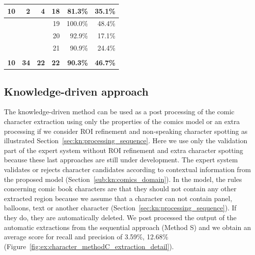 \begin{table}[h]
\begin{tabular}{|c|l|l|r|r|r|}
\multicolumn{1}{|r|}{10} & \multicolumn{1}{r|}{2} & \multicolumn{1}{r|}{4} & 18 & 81.3\% & 35.1\% \\ \hline
 &   &  & 19 & 100.0\% & 48.4\% \\ \hline
 &   &  & 20 & 92.9\% & 17.1\% \\ \hline
 &   &  & 21 & 90.9\% & 24.4\% \\ \hline
 &  &  &  & &  \\ \hline %
\multicolumn{1}{|r|}{\textbf{10}} & \multicolumn{1}{r|}{\textbf{34}} & \multicolumn{1}{r|}{\textbf{22}} & \multicolumn{1}{r|}{\textbf{22}} & \textbf{90.3\%} & \textbf{46.7\%} \\ \hline
\end{tabular}
\label{tab:ex:character_spotting_detail_result}
\end{table}



\subsection{Knowledge-driven approach} %

The knowledge-driven method can be used as a post processing of the comic character extraction using only the properties of the comics model or an extra processing if we consider ROI refinement and non-speaking character spotting as illustrated Section~\ref{sec:kn:processing_sequence}.
Here we use only the validation part of the expert system without ROI refinement and extra character spotting because these last approaches are still under development.
The expert system validates or rejects character candidates according to contextual information from the proposed model (Section~\ref{sub:kn:comics_domain}).
In the model, the rules concerning comic book characters are that they should not contain any other extracted region because we assume that a character can not contain panel, balloons, text or another character (Section~\ref{sec:kn:processing_sequence}). If they do, they are automatically deleted.
We post processed the output of the automatic extractions from the sequential approach (Method S) and we obtain an average score for recall and precision of 3.59\%, 12.68\% (Figure~\ref{fig:ex:character_methodC_extraction_detail}).

